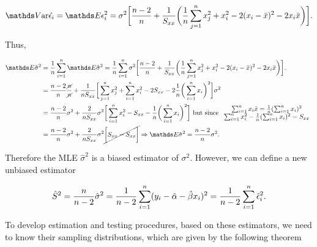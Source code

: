 \documentclass{homework}
\begin{document}
\begin{equation}
    \var \hat{\epsilon_i} = \E\epsilon^2_i = \sigma^2 \bigg[\frac{n-2}{n} + \frac{1}{S_{xx}} \bigg(\frac{1}{n} \sum_{j=1}^{n} x_j^2 + x_i^2 - 2(x_i - \bar{x})^2 - 2x_i \bar{x}\bigg) \bigg].
\end{equation}

Thus, 

\begin{align*}
    \E \hat{\sigma}^2 &= \frac{1}{n} \sum_{i=1}^{n} \E \hat{\sigma}^2 = \frac{1}{n} \sum_{i=1}^{n} \sigma^2 \bigg[\frac{n-2}{n} + \frac{1}{S_{xx}} \bigg(\frac{1}{n} \sum_{j=1}^{n} x_j^2 + x_i^2 - 2(x_i - \bar{x})^2 - 2x_i \bar{x}\bigg) \bigg]. \\
    &= \frac{n-2}{n} {\frac{\cancel n}{\cancel n}} + \frac{1}{nS_{xx}} \bigg[\sum_{j=1}^{n} x_j^2 + \sum_{i=1}^{n} x_i^2 - 2S_{xx} - 2\frac{1}{n} \bigg(\sum_{i=1}^{n} x_i\bigg)^2 \bigg] \sigma^2\\
    &= \frac{n-2}{n} \sigma^2 + \frac{2}{nS_{xx}} \sigma^2 \bigg[\summation x_i^2 - S_{xx} - \frac{1}{n} \bigg(\summation x_i\bigg)^2 \bigg] \textnormal{ but since } \begin{array}{c}
         \summation x_i \bar{x} = \frac{1}{n} (\summation x_i)^2  \\
         \summation x_i^2 - \frac{1}{n} (\summation x_i)^2 = S_{xx}
    \end{array} \\
    &= \frac{n-2}{n} \sigma^2 + \frac{2}{nS_{xx}} \sigma^2 \cancel{\bigg[S_{xx} - S_{xx} \bigg]} \Rightarrow  \E \hat{\sigma}^2 = \frac{n-2}{n} \sigma^2.
\end{align*}

Therefore the MLE $\hat{\sigma}^2$ is a biased estimator of $\sigma^2$. However, we can define a new unbiased estimator

$$
\hat{S}^2 = \frac{n}{n-2} \hat{\sigma}^2 = \frac{1}{n-2} \sum_{i=1}^{n} (y_i - \hat{\alpha} - \hat{\beta} x_i)^2 = \frac{1}{n-2} \sum_{i=1}^{n} \hat{\epsilon}_i^2.
$$

\clearpage

To develop estimation and testing procedures, based on these estimators, we need to know their sampling distributions, which are given by the following theorem
\end{document}
